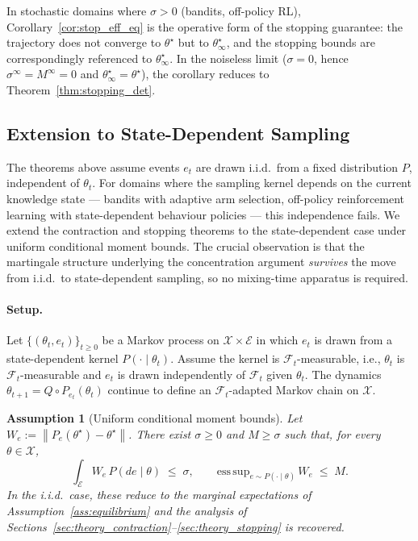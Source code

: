 \documentclass[12pt,a4paper]{article}
\newtheorem{assumption}[definition]{Assumption}
\newcommand{\X}{\mathcal{X}}
\newcommand{\E}{\mathcal{E}}
\newcommand{\norm}[1]{\left\lVert#1\right\rVert}
\begin{document}
In stochastic domains where $\sigma > 0$ (bandits, off-policy RL),
Corollary~\ref{cor:stop_eff_eq} is the operative form of the
stopping guarantee: the trajectory does not converge to $\theta^\star$ but
to $\theta^\star_\infty$, and the stopping bounds are correspondingly
referenced to $\theta^\star_\infty$. In the noiseless limit ($\sigma = 0$,
hence $\sigma^\infty = M^\infty = 0$ and $\theta^\star_\infty =
\theta^\star$), the corollary reduces to Theorem~\ref{thm:stopping_det}.

\subsection{Extension to State-Dependent Sampling}
\label{sec:state_dependent}

The theorems above assume events $e_t$ are drawn i.i.d.\ from a fixed
distribution $P$, independent of $\theta_t$. For domains where the sampling
kernel depends on the current knowledge state — bandits with adaptive arm
selection, off-policy reinforcement learning with state-dependent behaviour
policies — this independence
fails. We extend the contraction and stopping theorems to the state-dependent
case under uniform conditional moment bounds. The crucial observation is
that the martingale structure underlying the concentration argument
\emph{survives} the move from i.i.d.\ to state-dependent sampling, so no
mixing-time apparatus is required.

\paragraph{Setup.}
Let $\{(\theta_t, e_t)\}_{t \geq 0}$ be a Markov process on $\X \times \E$
in which $e_t$ is drawn from a state-dependent kernel $P(\cdot \mid \theta_t)$.
Assume the kernel is $\mathcal{F}_t$-measurable, i.e., $\theta_t$ is
$\mathcal{F}_t$-measurable and $e_t$ is drawn independently of
$\mathcal{F}_t$ given $\theta_t$. The dynamics
$\theta_{t+1} = Q \circ P_{e_t}(\theta_t)$ continue to define an
$\mathcal{F}_t$-adapted Markov chain on $\X$.

\begin{assumption}[Uniform conditional moment bounds]
\label{ass:cond_moments}
Let $W_e := \norm{P_e(\theta^\star) - \theta^\star}$. There exist
$\sigma \geq 0$ and $M \geq \sigma$ such that, for every $\theta \in \X$,
\[
  \int_\E W_e \, P(de \mid \theta) \;\leq\; \sigma,
  \qquad
  \mathrm{ess\,sup}_{e \sim P(\cdot \mid \theta)}\, W_e \;\leq\; M.
\]
In the i.i.d.\ case, these reduce to the marginal expectations of
Assumption~\ref{ass:equilibrium} and the analysis of
Sections~\ref{sec:theory_contraction}--\ref{sec:theory_stopping} is
recovered.
\end{assumption}
\end{document}
